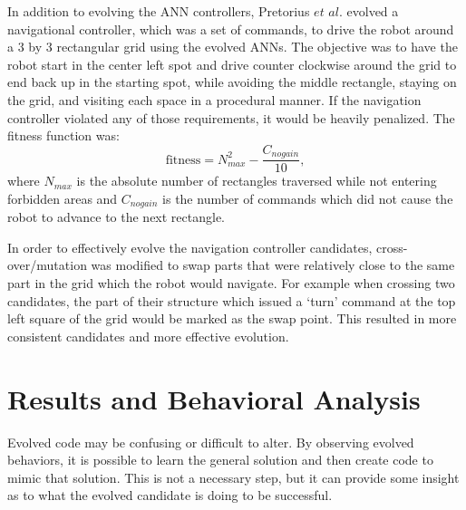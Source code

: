 \documentclass{sig-alternate}
\begin{document}
  In addition to evolving the ANN controllers, Pretorius $et$ $al.$ evolved a  navigational controller, which was a set of commands, to drive the robot around a 3 by 3 rectangular grid using the evolved ANNs. The objective was to have the robot start in the center left spot and drive counter clockwise around the grid to end back up in the starting spot, while avoiding the middle rectangle, staying on the grid, and visiting each space in a procedural manner. If the navigation controller violated any of those requirements, it would be heavily penalized. The fitness function was:
\[
  \textrm{fitness} = N_{max}^2 - \frac{C_{nogain}}{10},
\] 
where $N_{max}$ is the absolute number of rectangles traversed while not entering forbidden areas and $C_{nogain}$ is the number of commands which did not cause the robot to advance to the next rectangle.

	In order to effectively evolve the navigation controller candidates, cross-over/mutation was modified to swap parts that were relatively close to the same part in the grid which the robot would navigate. For example when crossing two candidates, the part of their structure which issued a `turn' command at the top left square of the grid would be marked as the swap point. This resulted in more consistent candidates and more effective evolution. 
\section{Results and Behavioral Analysis}\label{behavior}

  Evolved code may be confusing or difficult to alter. By observing evolved behaviors, it is possible to learn the general solution and then create code to mimic that solution. This is not a necessary step, but it can provide some insight as to what the evolved candidate is doing to be successful.
\end{document}
